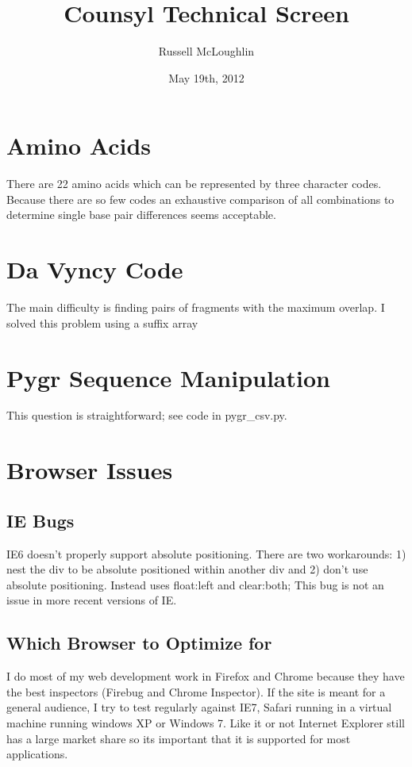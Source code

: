 \documentclass[12pt]{amsart}
\title{Counsyl Technical Screen}
\author{Russell McLoughlin}
\date{May 19th, 2012}
\begin{document}
\maketitle

\section{Amino Acids}

There are 22 amino acids which can be represented by three character codes. Because there are so few codes an exhaustive comparison of all combinations to determine single base pair differences seems acceptable.

\section{Da Vyncy Code}

The main difficulty is finding pairs of fragments with the maximum overlap. I solved this problem using a suffix array

\section{Pygr Sequence Manipulation}

This question is straightforward; see code in pygr\_csv.py.

\section{Browser Issues}

\subsection{IE Bugs}


IE6 doesn't properly support absolute positioning. There are two workarounds: 1) nest the div to be absolute positioned within another div and 2) don't use absolute positioning. Instead uses float:left and clear:both;  This bug is not an issue in more recent versions of IE.

\subsection{Which Browser to Optimize for}

I do most of my web development work in Firefox and Chrome because they have the best inspectors (Firebug and Chrome Inspector). If the site is meant for a general audience, I try to test regularly against IE7, Safari running in a virtual machine running windows XP or Windows 7. Like it or not Internet Explorer still has a large market share so its important that it is supported for most applications.
\end{document}
